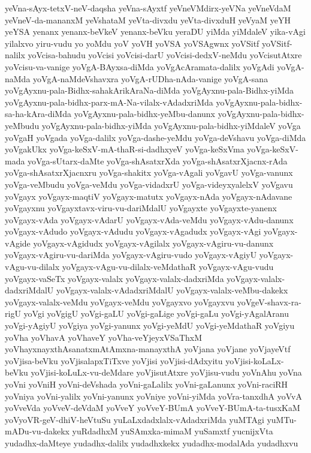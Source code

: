 {yeVna-sAyx-tetxV-neV-daqsha
yeVna-sAyxtf
yeVneVMdirx-yeVNa
yeVneVdaM
yeVneV-da-mananxM
yeVshataM
yeVta-divxdu
yeVta-divxduH
yeVyaM
yeYH
yeYSA
yenanx
yenanx-beVkeV
yenanx-beVku
yeraDU
yiMda
yiMdaleV
yika-vAgi
yilalxvo
yiru-vudu
yo
yoMdu
yoV
yoVH
yoVSA
yoVSAgwnx
yoVSitf
yoVSitf-nalilx
yoVcisa-bahudu
yoVcisi
yoVcisi-darU
yoVcisi-dedxV-neMdu
yoVcisutAtxre
yoVcisu-va-vanige
yoVgA-BAyxsa-diMda
yoVgAcAramata-dalilx
yoVgAdi
yoVgA-naMda
yoVgA-naMdeVshavxra
yoVgA-rUDha-nAda-vanige
yoVgA-sana
yoVgAyxnu-pala-Bidhx-sahakArikAraNa-diMda
yoVgAyxnu-pala-Bidhx-yiMda
yoVgAyxnu-pala-bidhx-parx-mA-Na-vilalx-vAdadxriMda
yoVgAyxnu-pala-bidhx-sa-ha-kAra-diMda
yoVgAyxnu-pala-bidhx-yeMbu-danunx
yoVgAyxnu-pala-bidhx-yeMbudu
yoVgAyxnu-pala-bidhx-yiMda
yoVgAyxnu-pala-bidhx-yiMdaleV
yoVga
yoVgaH
yoVgada
yoVga-dalilx
yoVga-dashe-yeMdu
yoVga-deVshavu
yoVga-diMda
yoVgakUkx
yoVga-keSxV-mA-thaR-si-dadhxyeV
yoVga-keSxVma
yoVga-keSxV-mada
yoVga-sUtarx-daMte
yoVga-shAsatxrXda
yoVga-shAsatxrXjacnx-rAda
yoVga-shAsatxrXjacnxru
yoVga-shakitx
yoVga-vAgali
yoVgavU
yoVga-vanunx
yoVga-veMbudu
yoVga-veMdu
yoVga-vidadxrU
yoVga-videyxyalelxV
yoVgavu
yoVgayx
yoVgayx-maqtiV
yoVgayx-matutx
yoVgayx-nAda
yoVgayx-nAdavane
yoVgayxnu
yoVgayxtavx-viru-vu-dariMdalU
yoVgayxte
yoVgayxte-yanenx
yoVgayx-vAda
yoVgayx-vAdarU
yoVgayx-vAda-veMdu
yoVgayx-vAdu-danunx
yoVgayx-vAdudo
yoVgayx-vAdudu
yoVgayx-vAgadudx
yoVgayx-vAgi
yoVgayx-vAgide
yoVgayx-vAgidudx
yoVgayx-vAgilalx
yoVgayx-vAgiru-vu-danunx
yoVgayx-vAgiru-vu-dariMda
yoVgayx-vAgiru-vudo
yoVgayx-vAgiyU
yoVgayx-vAgu-vu-dilalx
yoVgayx-vAgu-vu-dilalx-veMdathaR
yoVgayx-vAgu-vudu
yoVgayx-vaSeTx
yoVgayx-valalx
yoVgayx-valalx-dadxriMda
yoVgayx-valalx-dadxriMdalU
yoVgayx-valalx-vAdadxriMdalU
yoVgayx-valalx-veMbu-dakekx
yoVgayx-valalx-veMdu
yoVgayx-veMdu
yoVgayxvo
yoVgayxvu
yoVgeV-shavx-ra-rigU
yoVgi
yoVgigU
yoVgi-gaLU
yoVgi-gaLige
yoVgi-gaLu
yoVgi-yAgalAranu
yoVgi-yAgiyU
yoVgiya
yoVgi-yanunx
yoVgi-yeMdU
yoVgi-yeMdathaR
yoVgiyu
yoVha
yoVhavA
yoVhaveY
yoVha-veYjeyxVSaThxM
yoVhayxnayxthAsanatxmAtAmxna-manayxthA
yoVjana
yoVjane
yoVjayeVtf
yoVjisa-beVku
yoVjisalapxTiTxve
yoVjisi
yoVjisi-dAdxyitu
yoVjisi-koLaLx-beVku
yoVjisi-koLuLx-vu-deMdare
yoVjisutAtxre
yoVjisu-vudu
yoVnAhu
yoVna
yoVni
yoVniH
yoVni-deVshada
yoVni-gaLalilx
yoVni-gaLanunx
yoVni-raciRH
yoVniya
yoVni-yalilx
yoVni-yanunx
yoVniye
yoVni-yiMda
yoVra-tanxdhA
yoVvA
yoVveVda
yoVveV-deVdaM
yoVveY
yoVveY-BUmA
yoVveY-BUmA-ta-tusxKaM
yoVyoVR-geV-dhiV-heVtuSu
yuLaLxdadxlalx-vAdadxriMda
yuMTAgi
yuMTu-mADu-vu-dakekx
yuRdadhxM
yuSAmxka-mimaM
yuSamxtf
yucnijxVta
yudadhx-daMteye
yudadhx-dalilx
yudadhxkekx
yudadhx-modalAda
yudadhxvu
}
